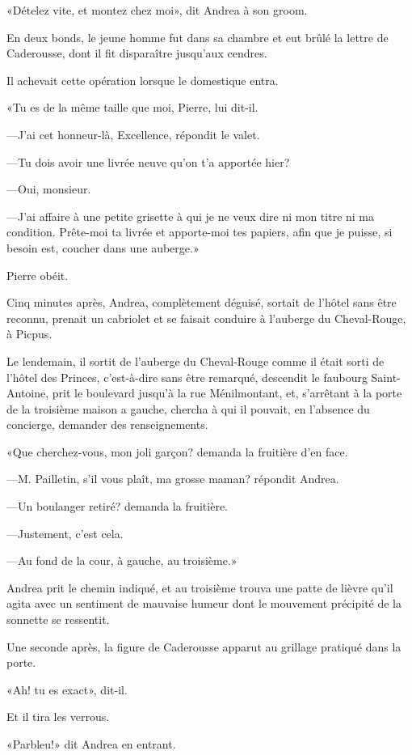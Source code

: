 «Dételez vite, et montez chez moi», dit Andrea à son groom. 

En deux bonds, le jeune homme fut dans sa chambre et eut brûlé la lettre de Caderousse, dont il fit disparaître jusqu'aux cendres. 

Il achevait cette opération lorsque le domestique entra. 

«Tu es de la même taille que moi, Pierre, lui dit-il. 

—J'ai cet honneur-là, Excellence, répondit le valet. 

—Tu dois avoir une livrée neuve qu'on t'a apportée hier? 

—Oui, monsieur. 

—J'ai affaire à une petite grisette à qui je ne veux dire ni mon titre ni ma condition. Prête-moi ta livrée et apporte-moi tes papiers, afin que je puisse, si besoin est, coucher dans une auberge.» 

Pierre obéit. 

Cinq minutes après, Andrea, complètement déguisé, sortait de l'hôtel sans être reconnu, prenait un cabriolet et se faisait conduire à l'auberge du Cheval-Rouge, à Picpus. 

Le lendemain, il sortit de l'auberge du Cheval-Rouge comme il était sorti de l'hôtel des Princes, c'est-à-dire sans être remarqué, descendit le faubourg Saint-Antoine, prit le boulevard jusqu'à la rue Ménilmontant, et, s'arrêtant à la porte de la troisième maison a gauche, chercha à qui il pouvait, en l'absence du concierge, demander des renseignements. 

«Que cherchez-vous, mon joli garçon? demanda la fruitière d'en face. 

—M. Pailletin, s'il vous plaît, ma grosse maman? répondit Andrea. 

—Un boulanger retiré? demanda la fruitière. 

—Justement, c'est cela. 

—Au fond de la cour, à gauche, au troisième.» 

Andrea prit le chemin indiqué, et au troisième trouva une patte de lièvre qu'il agita avec un sentiment de mauvaise humeur dont le mouvement précipité de la sonnette se ressentit. 

Une seconde après, la figure de Caderousse apparut au grillage pratiqué dans la porte. 

«Ah! tu es exact», dit-il. 

Et il tira les verrous. 

«Parbleu!» dit Andrea en entrant. 

